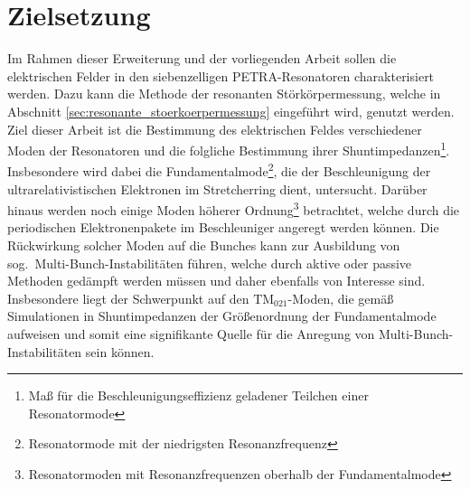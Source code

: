 \section{Zielsetzung}
Im Rahmen dieser Erweiterung und der vorliegenden Arbeit sollen die elektrischen Felder in den siebenzelligen PETRA-Resonatoren charakterisiert werden.
Dazu kann die Methode der resonanten Störkörpermessung, welche in Abschnitt \ref{sec:resonante_stoerkoerpermessung} eingeführt wird, genutzt werden.
Ziel dieser Arbeit ist die Bestimmung des elektrischen Feldes verschiedener Moden der Resonatoren und die folgliche Bestimmung ihrer Shuntimpedanzen\footnote{Maß für die Beschleunigungseffizienz geladener Teilchen einer Resonatormode}.
Insbesondere wird dabei die Fundamentalmode\footnote{Resonatormode mit der niedrigsten Resonanzfrequenz}, die der Beschleunigung der ultrarelativistischen Elektronen im Stretcherring dient, untersucht.
Darüber hinaus werden noch einige Moden höherer Ordnung\footnote{Resonatormoden mit Resonanzfrequenzen oberhalb der Fundamentalmode} betrachtet, welche durch die periodischen Elektronenpakete im Beschleuniger angeregt werden können.
Die Rückwirkung solcher Moden auf die Bunches kann zur Ausbildung von sog.\ Multi-Bunch-Instabilitäten führen, welche durch aktive oder passive Methoden gedämpft werden müssen und daher ebenfalls von Interesse sind.
Insbesondere liegt der Schwerpunkt auf den $\mathrm{TM}_{021}$-Moden, die gemäß Simulationen in \cite{schedler} Shuntimpedanzen der Größenordnung der Fundamentalmode aufweisen und somit eine signifikante Quelle für die Anregung von Multi-Bunch-Instabilitäten sein können.
